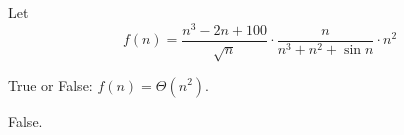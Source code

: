 \begin{prob}
    Let
    \[
        f(n) = 
        \frac{n^3 - 2n + 100}{\sqrt n}
        \cdot
        \frac{n}{n^3 + n^2 + \sin n}
        \cdot n^2
    \]

    True or False: $f(n) = \Theta(n^2)$.
    \tF{}

    \begin{soln}
        False.
    \end{soln}

\end{prob}
